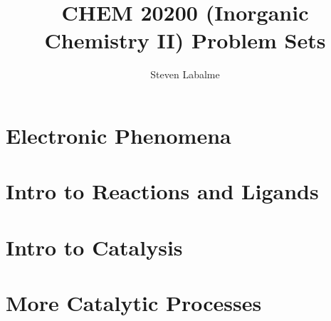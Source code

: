 \documentclass[titlepage]{article}
\title{CHEM 20200 (Inorganic Chemistry II) Problem Sets}
\author{Steven Labalme}
\begin{document}
\maketitle



\tableofcontents
\newpage



\pagestyle{main}
\renewcommand{\leftmark}{Homework \thesection}
\section{Electronic Phenomena}

\newpage



\section{Intro to Reactions and Ligands}

\newpage



\section{Intro to Catalysis}

\newpage



\section{More Catalytic Processes}

\newpage



\renewcommand{\leftmark}{References}
\printbibliography[heading=bibintoc]
\end{document}
